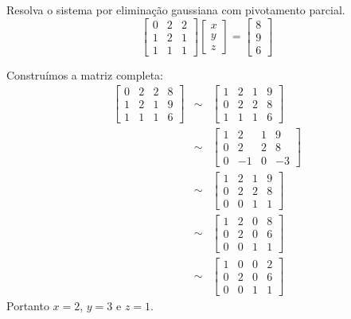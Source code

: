 \begin{ex}
Resolva o sistema por eliminação gaussiana com pivotamento parcial.
\begin{equation*}
\left[
\begin{array}{ccc}
0 &2& 2\\
1 &2& 1\\
1 & 1 &1
\end{array}
\right]
\left[
\begin{array}{c}
x\\
y\\
z
\end{array}
\right]=
\left[
\begin{array}{c}
8\\
9\\
6
\end{array}
\right]  
\end{equation*}
\end{ex}

\begin{sol}
Construímos a matriz completa:
\begin{eqnarray*}\left[
\begin{array}{ccc|c}
0 &2& 2&8\\
1 &2& 1&9\\
1 & 1 &1&6
\end{array}
\right] &\sim&
\left[
\begin{array}{ccc|c}
1 &2& 1&9\\
0 &2& 2&8\\
1 & 1 &1&6
\end{array}
\right] \\ 
&\sim&
\left[
\begin{array}{ccc|c}
1 &2& 1&9\\
0 &2& 2&8\\
0 & -1 &0&-3
\end{array}
\right]\\
&\sim&
\left[
\begin{array}{ccc|c}
1 &2& 1&9\\
0 &2& 2&8\\
0 & 0 &1&1
\end{array}
\right]\\
&\sim&
\left[
\begin{array}{ccc|c}
1 &2& 0&8\\
0 &2& 0&6\\
0 & 0 &1&1
\end{array}
\right]\\
&\sim&
\left[
\begin{array}{ccc|c}
1 &0& 0&2\\
0 &2& 0&6\\
0 & 0 &1&1
\end{array}
\right]
\end{eqnarray*}
Portanto $x=2$, $y=3$ e $z=1$.
\end{sol}

